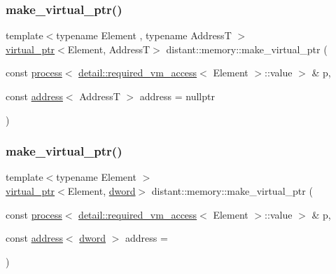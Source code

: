 \mbox{\label{namespacedistant_1_1memory_a960d8c20d10f2451ed596b4de4498bcd}} 
\subsubsection{\texorpdfstring{make\+\_\+virtual\+\_\+ptr()}{make\_virtual\_ptr()}\hspace{0.1cm}{\footnotesize\ttfamily [1/2]}}
{\footnotesize\ttfamily template$<$typename Element , typename AddressT $>$ \\
\mbox{\hyperlink{classdistant_1_1memory_1_1virtual__ptr}{virtual\+\_\+ptr}}$<$Element, AddressT$>$ distant\+::memory\+::make\+\_\+virtual\+\_\+ptr (\begin{DoxyParamCaption}\item[{const \mbox{\hyperlink{classdistant_1_1kernel__objects_1_1process}{process}}$<$ \mbox{\hyperlink{structdistant_1_1memory_1_1detail_1_1required__vm__access}{detail\+::required\+\_\+vm\+\_\+access}}$<$ Element $>$\+::value $>$ \&}]{p,  }\item[{const \mbox{\hyperlink{classdistant_1_1memory_1_1address}{address}}$<$ AddressT $>$}]{address = {\ttfamily nullptr} }\end{DoxyParamCaption})\hspace{0.3cm}{\ttfamily [noexcept]}}

\mbox{\label{namespacedistant_1_1memory_acb30dfca8c04ed8d001247c5073067e0}} 
\subsubsection{\texorpdfstring{make\+\_\+virtual\+\_\+ptr()}{make\_virtual\_ptr()}\hspace{0.1cm}{\footnotesize\ttfamily [2/2]}}
{\footnotesize\ttfamily template$<$typename Element $>$ \\
\mbox{\hyperlink{classdistant_1_1memory_1_1virtual__ptr}{virtual\+\_\+ptr}}$<$Element, \mbox{\hyperlink{namespacedistant_a9fa41a5a1a17dcbd24da1c1855c92489}{dword}}$>$ distant\+::memory\+::make\+\_\+virtual\+\_\+ptr (\begin{DoxyParamCaption}\item[{const \mbox{\hyperlink{classdistant_1_1kernel__objects_1_1process}{process}}$<$ \mbox{\hyperlink{structdistant_1_1memory_1_1detail_1_1required__vm__access}{detail\+::required\+\_\+vm\+\_\+access}}$<$ Element $>$\+::value $>$ \&}]{p,  }\item[{const \mbox{\hyperlink{classdistant_1_1memory_1_1address}{address}}$<$ \mbox{\hyperlink{namespacedistant_a9fa41a5a1a17dcbd24da1c1855c92489}{dword}} $>$}]{address = {} }\end{DoxyParamCaption})\hspace{0.3cm}{\ttfamily [noexcept]}}

